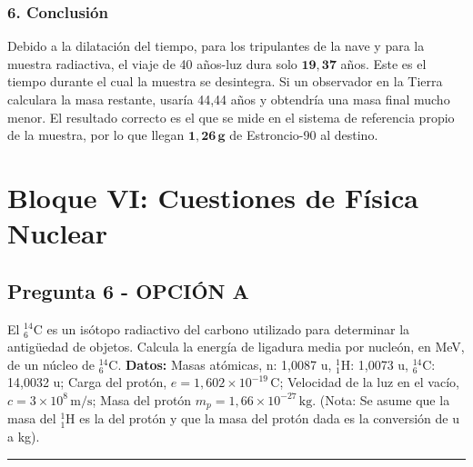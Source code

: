 \subsubsection*{6. Conclusión}
\begin{cajaconclusion}
Debido a la dilatación del tiempo, para los tripulantes de la nave y para la muestra radiactiva, el viaje de 40 años-luz dura solo $\mathbf{19,37}$ años. Este es el tiempo durante el cual la muestra se desintegra. Si un observador en la Tierra calculara la masa restante, usaría 44,44 años y obtendría una masa final mucho menor. El resultado correcto es el que se mide en el sistema de referencia propio de la muestra, por lo que llegan $\mathbf{1,26 \, g}$ de Estroncio-90 al destino.
\end{cajaconclusion}

\newpage

\section{Bloque VI: Cuestiones de Física Nuclear}
\label{sec:nuclear_2003_jun_ord}

\subsection{Pregunta 6 - OPCIÓN A}
\label{subsec:6A_2003_jun_ord}

\begin{cajaenunciado}
El ${}^{14}_6\text{C}$ es un isótopo radiactivo del carbono utilizado para determinar la antigüedad de objetos. Calcula la energía de ligadura media por nucleón, en MeV, de un núcleo de ${}^{14}_6\text{C}$.
\textbf{Datos:} Masas atómicas, n: 1,0087 u, ${}^1_1$H: 1,0073 u, ${}^{14}_6$C: 14,0032 u; Carga del protón, $e=1,602\times10^{-19}\,\text{C}$; Velocidad de la luz en el vacío, $c=3\times10^8\,\text{m/s}$; Masa del protón $m_p=1,66\times10^{-27}\,\text{kg}$. (Nota: Se asume que la masa del ${}^1_1$H es la del protón y que la masa del protón dada es la conversión de u a kg).
\end{cajaenunciado}
\hrule

